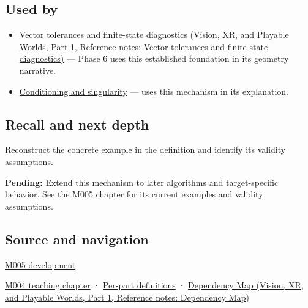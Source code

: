 \subsection{Used by}\label{appendix-0ec599f8ba27-used-by}

\hypertarget{appendix-0ec599f8ba27-used-by}{}

\begin{itemize}
\item
  \href{../07-Vision-XR-and-Playable-Worlds-P01/main.pdf\#appendix-b5b83329215b}{Vector tolerances and finite-state diagnostics (Vision, XR, and Playable Worlds, Part 1, Reference notes: Vector tolerances and finite-state diagnostics)} --- Phase 6 uses this established foundation in its geometry narrative.
\item
  \hyperref[appendix-8f6a01f284a7]{Conditioning and singularity} --- uses this mechanism in its explanation.
\end{itemize}

\subsection{Recall and next depth}\label{appendix-0ec599f8ba27-recall-and-next-depth}

\hypertarget{appendix-0ec599f8ba27-recall-and-next-depth}{}

Reconstruct the concrete example in the definition and identify its validity assumptions.

\textbf{Pending:} Extend this mechanism to later algorithms and target-specific behavior. See the M005 chapter for its current examples and validity assumptions.

\subsection{Source and navigation}\label{appendix-0ec599f8ba27-source-and-navigation}

\hypertarget{appendix-0ec599f8ba27-source-and-navigation}{}

\hyperref[01-foundations-i-ch001-when-arithmetic-meets-uncertainty]{M005 development}

\hyperref[01-foundations-i-ch001-a-stretching-ruler-for-real-valued-quantities]{M004 teaching chapter} · \hyperref[appendix-fd090d982a15-m004---parts-61-76]{Per-part definitions} · \href{../07-Vision-XR-and-Playable-Worlds-P01/main.pdf\#appendix-4ad47bdd269a}{Dependency Map (Vision, XR, and Playable Worlds, Part 1, Reference notes: Dependency Map)}
